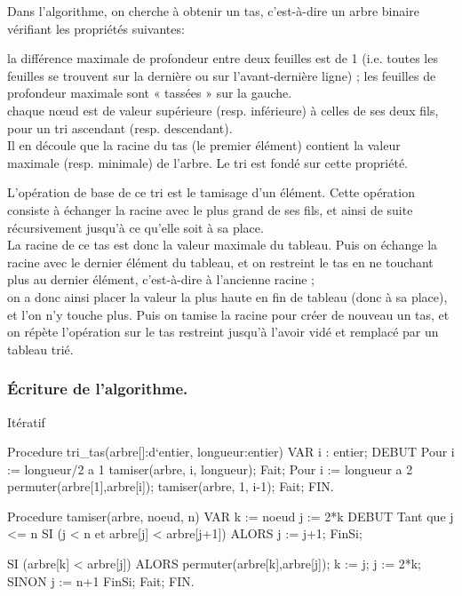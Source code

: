 \documentclass[12pt]{article}
\begin{document}
Dans l'algorithme, on cherche à obtenir un tas, c'est-à-dire un arbre binaire vérifiant les propriétés suivantes: 

la différence maximale de profondeur entre deux feuilles est de 1 
(i.e. toutes les feuilles se trouvent sur la dernière ou sur l'avant-dernière ligne) ;
les feuilles de profondeur maximale sont « tassées » sur la gauche.\\
chaque nœud est de valeur supérieure (resp. inférieure) à celles de ses deux fils, 
pour un tri ascendant (resp. descendant).\\
Il en découle que la racine du tas (le premier élément) contient la valeur maximale (resp. minimale) de l'arbre. 
Le tri est fondé sur cette propriété.

L'opération de base de ce tri est le tamisage d'un élément.
 Cette opération consiste à échanger la racine avec le plus grand de ses fils,
 et ainsi de suite récursivement jusqu'à ce qu'elle soit à sa place. \\
 La racine de ce tas est donc la valeur maximale du tableau.
 Puis on échange la racine avec le dernier élément du tableau, 
 et on restreint le tas en ne touchant plus au dernier élément, 
 c'est-à-dire à l'ancienne racine ;\\
 on a donc ainsi placer la valeur la plus haute en fin de tableau (donc à sa place), 
 et l'on n'y touche plus. Puis on tamise la racine pour créer de nouveau un tas,
 et on répète l'opération sur le tas restreint jusqu'à l'avoir vidé et remplacé par un tableau trié.\\ 

\subsubsection{Écriture de l'algorithme.}
 Itératif
 \begin{sql}
Procedure tri_tas(arbre[]:d`entier, longueur:entier)
VAR
	i : entier;
DEBUT
   Pour i := longueur/2 a 1
       tamiser(arbre, i, longueur);
   Fait;
   Pour i := longueur a 2
       permuter(arbre[1],arbre[i]);
       tamiser(arbre, 1, i-1);
   Fait;
FIN.

Procedure tamiser(arbre, noeud, n)
VAR
	k := noeud
	j := 2*k
DEBUT
	Tant que j <= n
	    SI (j < n et arbre[j] < arbre[j+1])
    	ALORS j := j+1;
    	FinSi;
    
    	SI (arbre[k] < arbre[j])
    	ALORS
    		permuter(arbre[k],arbre[j]);
    	    k := j;
    	    j := 2*k;
		SINON
			j := n+1
    	FinSi;
	Fait;
FIN.
 \end{sql}
\end{document}
